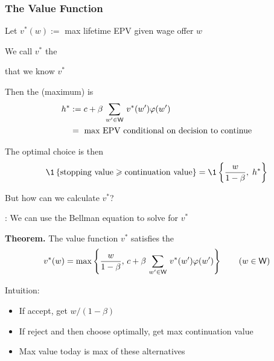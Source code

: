 \begin{frame}
    \frametitle{The Value Function}

    Let  $v^*(w) :=$ max lifetime EPV given wage offer $w$
    \vspace{0.4em}

    We call $v^*$ the 

    \vspace{0.4em}
     that we know $v^*$

    \vspace{0.4em}
    Then the (maximum)  is 
    \begin{align*}
        h^* 
        & := c + \beta \, \sum_{w' \in \mathsf W} \, v^*(w') \varphi(w') 
        \\
        & = \text{ max EPV conditional on decision to continue}
    \end{align*}

    The optimal choice is then
    \begin{equation*}
         \1
        \left\{
            \text{stopping value} \geq \text{continuation value}
        \right\}
         = \1
        \left\{
            \frac{w}{1 - \beta}, \; h^*
        \right\}
    \end{equation*}


\end{frame}


\begin{frame}

    But how can we calculate $v^*$?

    \vspace{0.4em}
    : We can use the Bellman equation to solve for $v^*$

    \vspace{0.4em}
    {\bf Theorem.} The value function $v^*$ satisfies the 
    \begin{equation*}
        v^*(w) = 
        \max \left\{
            \frac{w}{1-\beta}
            ,\,
            c + \beta \, \sum_{w' \in \mathsf W} \, v^*(w') \varphi(w')
            \right\}
            \qquad (w \in \mathsf W)
    \end{equation*}

    Intuition:
    \begin{itemize}
        \item If accept, get $w/(1-\beta)$
        \item If reject and then choose optimally, get max continuation value
        \item Max value today is max of these alternatives
    \end{itemize}


\end{frame}



